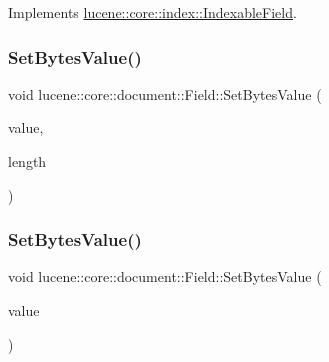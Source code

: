 Implements \mbox{\hyperlink{classlucene_1_1core_1_1index_1_1IndexableField_a5d1bcc66e1f03e2ce8c328302a735486}{lucene\+::core\+::index\+::\+Indexable\+Field}}.

\mbox{\label{classlucene_1_1core_1_1document_1_1Field_a4b92c42bb91ef113806dbee6d4ee12d1}} 
\subsubsection{\texorpdfstring{Set\+Bytes\+Value()}{SetBytesValue()}\hspace{0.1cm}{\footnotesize\ttfamily [1/3]}}
{\footnotesize\ttfamily void lucene\+::core\+::document\+::\+Field\+::\+Set\+Bytes\+Value (\begin{DoxyParamCaption}\item[{const char $\ast$}]{value,  }\item[{uint32\+\_\+t}]{length }\end{DoxyParamCaption})\hspace{0.3cm}{\ttfamily [inline]}}

\mbox{\label{classlucene_1_1core_1_1document_1_1Field_a96f2902e74079e79fe469487b1113b13}} 
\subsubsection{\texorpdfstring{Set\+Bytes\+Value()}{SetBytesValue()}\hspace{0.1cm}{\footnotesize\ttfamily [2/3]}}
{\footnotesize\ttfamily void lucene\+::core\+::document\+::\+Field\+::\+Set\+Bytes\+Value (\begin{DoxyParamCaption}\item[{const \mbox{\hyperlink{classlucene_1_1core_1_1util_1_1BytesRef}{lucene\+::core\+::util\+::\+Bytes\+Ref}} \&}]{value }\end{DoxyParamCaption})\hspace{0.3cm}{\ttfamily [inline]}}

